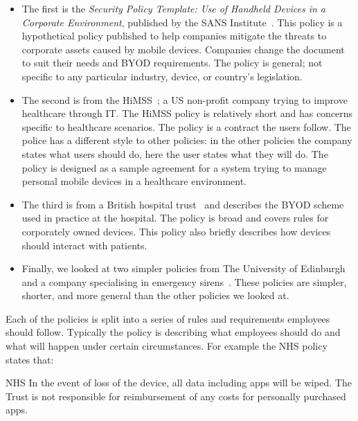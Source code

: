 \documentclass[thesis.tex]{subfiles}
\begin{document}
\begin{itemize}
\item The first is the \emph{Security Policy Template: Use of Handheld Devices
    in a Corporate Environment}, published by the SANS
  Institute~\cite{nicholas_r._c._guerin_security_2008}. This policy is a
  hypothetical policy published to help companies mitigate the threats to
  corporate assets caused by mobile devices. Companies change the
  document to suit their needs and BYOD requirements. The policy is general; not specific to any
  particular industry, device, or country's legislation.
\item The second is from the
  \ac{HiMSS}~\cite{healthcare_information_and_management_systems_society_mobile_2012};
  a US non-profit company trying to improve healthcare through IT. The
  \ac{HiMSS} policy is relatively short and has concerns specific to healthcare
  scenarios. The policy is a contract the users follow. The police has a
  different style to other policies: in the other policies the company states
  what users should do, here the user states what they will do.  The policy is
  designed as a sample agreement for a system trying to manage personal mobile
  devices in a healthcare environment.
\item The third is from a British hospital
  trust~\cite{kennington_mobiles_2014} and describes the BYOD scheme used in
  practice at the hospital.  The policy is broad and covers rules for
  corporately owned devices.  This policy also briefly describes how devices
  should interact with patients.
\item Finally, we looked at two simpler policies from The University of
  Edinburgh~\cite{williamson_bring_2015} and a company specialising in emergency
  sirens~\cite{code3pse.org_sample_????}. These policies are simpler, shorter,
  and more general than the other policies we looked at. 
\end{itemize}

Each of the policies is split into a series of rules and requirements employees
should follow. Typically the policy is describing what employees should
do and what will happen under certain circumstances. For example the NHS policy
states that:

\begin{policyrule}{NHS}
  In the event of loss of the device, all data including apps will be wiped. The Trust
  is not responsible for reimbursement of any costs for personally purchased apps.
\end{policyrule}
\end{document}
